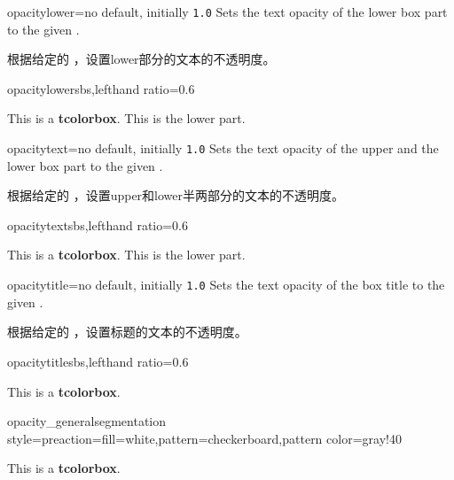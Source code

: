 \begin{docTcbKey}{opacitylower}{=}{no default, initially \texttt{1.0}}
Sets the text opacity of the lower box part to the given .

根据给定的 ，设置lower部分的文本的不透明度。
\begin{exdispExample*}{opacitylower}{sbs,lefthand ratio=0.6}
\begin{tcolorbox}[enhanced,opacitylower=0.5,
interior style={preaction={fill=white},pattern=checkerboard,pattern color=gray!40}]
This is a \textbf{tcolorbox}.
\tcblower
This is the lower part.
\end{tcolorbox}
\end{exdispExample*}
\end{docTcbKey}

\begin{docTcbKey}{opacitytext}{=}{no default, initially \texttt{1.0}}
Sets the text opacity of the upper and the lower box part to the given .

根据给定的 ，设置upper和lower半两部分的文本的不透明度。
\begin{exdispExample*}{opacitytext}{sbs,lefthand ratio=0.6}
\begin{tcolorbox}[enhanced,opacitytext=0.5,
interior style={preaction={fill=white},pattern=checkerboard,pattern color=gray!40}]
This is a \textbf{tcolorbox}.
\tcblower
This is the lower part.
\end{tcolorbox}
\end{exdispExample*}
\end{docTcbKey}


\begin{docTcbKey}{opacitytitle}{=}{no default, initially \texttt{1.0}}
Sets the text opacity of the box title to the given .

根据给定的 ，设置标题的文本的不透明度。
\begin{exdispExample*}{opacitytitle}{sbs,lefthand ratio=0.6}
\begin{tcolorbox}[enhanced,opacitytitle=0.7,
coltitle=black,
fonttitle=\bfseries,title=This is a title,
title style={preaction={fill=white},pattern=checkerboard,pattern color=gray!40}]
This is a \textbf{tcolorbox}.
\end{tcolorbox}
\end{exdispExample*}
\end{docTcbKey}


\begin{exdispExample*}{opacity_general}{segmentation style={preaction={fill=white},pattern=checkerboard,pattern color=gray!40}}
\begin{tcolorbox}[enhanced jigsaw,fonttitle=\bfseries,title=This is a title,
opacityframe=0.5,opacityback=0.25,opacitybacktitle=0.25,opacitytext=0.8,
colback=red!5!white,colframe=red!75!black,colbacktitle=yellow!20!red]
This is a \textbf{tcolorbox}.
\end{tcolorbox}
\end{exdispExample*}
